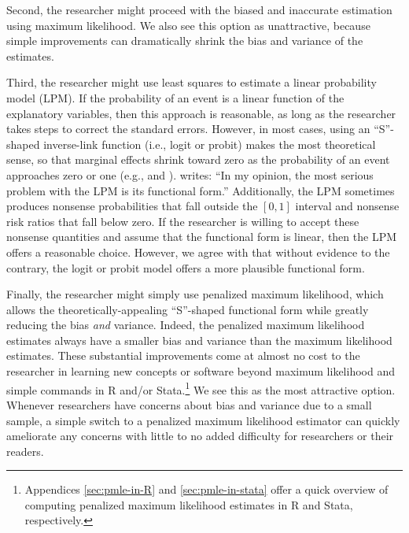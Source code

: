 \documentclass[12pt]{article}
\begin{document}
Second, the researcher might proceed with the biased and inaccurate estimation using maximum likelihood.
We also see this option as unattractive, because simple improvements can dramatically shrink the bias and variance of the estimates.

Third, the researcher might use least squares to estimate a linear probability model (LPM). If the probability of an event is a linear function of the explanatory variables, then this approach is reasonable, as long as the researcher takes steps to correct the standard errors.
However, in most cases, using an ``S''-shaped inverse-link function (i.e., logit or probit) makes the most theoretical sense, so that marginal effects shrink toward zero as the probability of an event approaches zero or one (e.g.,
\citealt{BerryDeMerittEsarey2010} and \citealt[pp. 34-47]{Long1997}).
\citet[p. 40]{Long1997} writes: ``In my opinion, the most serious problem with the LPM is its functional form.''
Additionally, the LPM sometimes produces nonsense probabilities that fall outside the $[0, 1]$ interval and nonsense risk ratios that fall below zero.
If the researcher is willing to accept these nonsense quantities and assume that the functional form is linear, then the LPM offers a reasonable choice.
However, we agree with \cite{Long1997} that without evidence to the contrary, the logit or probit model offers a more plausible functional form.

Finally, the researcher might simply use penalized maximum likelihood, which allows the theoretically-appealing ``S''-shaped functional form while greatly reducing the bias \textit{and} variance.
Indeed, the penalized maximum likelihood estimates always have a smaller bias and variance than the maximum likelihood estimates.
These substantial improvements come at almost no cost to the researcher in learning new concepts or software beyond maximum likelihood and simple commands in R and/or Stata.\footnote{Appendices \ref{sec:pmle-in-R} and \ref{sec:pmle-in-stata} offer a quick overview of computing penalized maximum likelihood estimates in R and Stata, respectively.}
We see this as the most attractive option.
Whenever researchers have concerns about bias and variance due to a small sample, a simple switch to a penalized maximum likelihood estimator can quickly ameliorate any concerns with little to no added difficulty for researchers or their readers.

\singlespace
\normalsize

%

\end{document}
